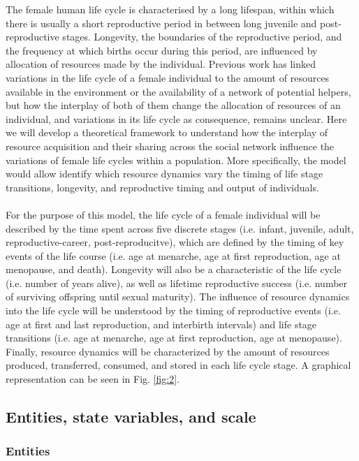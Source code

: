 \documentclass{article}
\begin{document}
The female human life cycle is characterised by a long lifespan, within which there is usually a short reproductive period in between long juvenile and post-reproductive stages. Longevity, the boundaries of the reproductive period, and the frequency at which births occur during this period, are influenced by allocation of resources made by the individual. Previous work has linked variations in the life cycle of a female individual to the amount of resources available in the environment or the availability of a network of potential helpers, but how the interplay of both of them change the allocation of resources of an individual, and variations in its life cycle as consequence, remains unclear. Here we will develop a theoretical framework to understand how the interplay of resource acquisition and their sharing across the social network influence the variations of female life cycles within a population. More specifically, the model would allow identify which resource dynamics vary the timing of life stage transitions, longevity, and reproductive timing and output of individuals.
\\\\
For the purpose of this model, the life cycle of a female individual will be described by the time spent across five discrete stages (i.e. infant, juvenile, adult, reproductive-career, post-reproducitve), which are defined by the timing of key events of the life course (i.e. age at menarche, age at first reproduction, age at menopause, and death). Longevity will also be a characteristic of the life cycle (i.e. number of years alive), as well as lifetime reproductive success (i.e. number of surviving offspring until sexual maturity). The influence of resource dynamics into the life cycle will be understood by the timing of reproductive events (i.e. age at first and last reproduction, and interbirth intervals) and life stage transitions (i.e. age at menarche, age at first reproduction, age at menopause). Finally, resource dynamics will be characterized by the amount of resources produced, transferred, consumed, and stored in each life cycle stage. A graphical representation can be seen in Fig. \ref{fig:2}.

\subsection{Entities, state variables, and scale}

\subsubsection{Entities}
\end{document}
